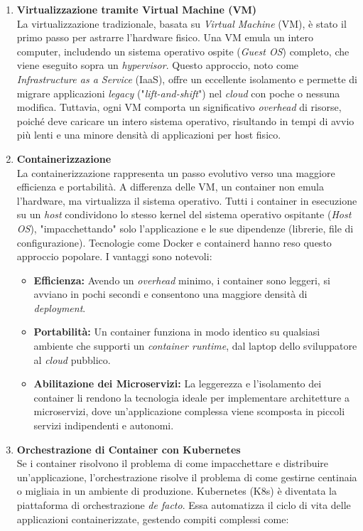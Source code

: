\begin{enumerate}
    \item \textbf{Virtualizzazione tramite Virtual Machine (VM)} \\ La virtualizzazione tradizionale, basata su \textit{Virtual Machine} (VM), è stato il primo passo per astrarre l'hardware fisico. Una VM emula un intero computer, includendo un sistema operativo ospite (\textit{Guest OS}) completo, che viene eseguito sopra un \textit{hypervisor}. Questo approccio, noto come \textit{Infrastructure as a Service} (IaaS), offre un eccellente isolamento e permette di migrare applicazioni \textit{legacy} ("\textit{lift-and-shift}") nel \textit{cloud} con poche o nessuna modifica. Tuttavia, ogni VM comporta un significativo \textit{overhead} di risorse, poiché deve caricare un intero sistema operativo, risultando in tempi di avvio più lenti e una minore densità di applicazioni per host fisico.
    
    \item \textbf{Containerizzazione}\\La containerizzazione rappresenta un passo evolutivo verso una maggiore efficienza e portabilità. A differenza delle VM, un container non emula l'hardware, ma virtualizza il sistema operativo. Tutti i container in esecuzione su un \textit{host} condividono lo stesso kernel del sistema operativo ospitante (\textit{Host OS}), "impacchettando" solo l'applicazione e le sue dipendenze (librerie, file di configurazione). Tecnologie come Docker e containerd hanno reso questo approccio popolare. I vantaggi sono notevoli:
    
    \begin{itemize}
        \item \textbf{Efficienza:} Avendo un \textit{overhead} minimo, i container sono leggeri, si avviano in pochi secondi e consentono una maggiore densità di \textit{deployment}.
        \item \textbf{Portabilità:} Un container funziona in modo identico su qualsiasi ambiente che supporti un \textit{container runtime}, dal laptop dello sviluppatore al \textit{cloud} pubblico.
        \item \textbf{Abilitazione dei Microservizi:} La leggerezza e l'isolamento dei container li rendono la tecnologia ideale per implementare architetture a microservizi, dove un'applicazione complessa viene scomposta in piccoli servizi indipendenti e autonomi.
    \end{itemize}
    
    \item \textbf{Orchestrazione di Container con Kubernetes}\\Se i container risolvono il problema di come impacchettare e distribuire un'applicazione, l'orchestrazione risolve il problema di come gestirne centinaia o migliaia in un ambiente di produzione. Kubernetes (K8s) è diventata la piattaforma di orchestrazione \textit{de facto}. Essa automatizza il ciclo di vita delle applicazioni containerizzate, gestendo compiti complessi come:
    

\end{enumerate}
